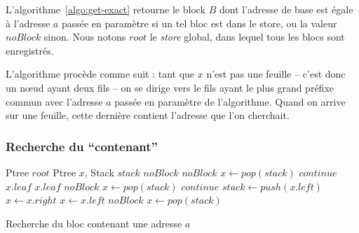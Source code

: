 L'algorithme~\ref{algo:get-exact} retourne le block $B$ dont l'adresse de base
est égale à l'adresse $a$ passée en paramètre si un tel bloc est dans le store,
ou la valeur $noBlock$ sinon.
Nous notons $root$ le {\em store} global, dans lequel tous les blocs sont
enregistrés.

L'algorithme procède comme suit : tant que $x$ n'est pas une feuille -- c'est
donc un n\oe{}ud ayant deux fils -- on se dirige vers le fils ayant le plus
grand préfixe commun avec l'adresse $a$ passée en paramètre de l'algorithme.
Quand on arrive sur une feuille, cette dernière contient l'adresse que l'on
cherchait.


\subsubsection*{Recherche du ``contenant''}


\begin{algorithm}[h!]
\begin{algorithmic}[1]
\Statex Ptree $root$
\Statex
{}
\Statex Ptree $x$, Stack $stack$
  \Return $noBlock$
\Else
          \Return $noBlock$
        \Else
          \State $x \gets \mathit{pop(stack)}$
          \State $\mathit{continue}$
        \EndIf
        \Return $\mathit{x.leaf}$
        \Return $\mathit{x.leaf}$
        \Return $noBlock$
      \Else
        \State $x \gets \mathit{pop(stack)}$
        \State $\mathit{continue}$
      \EndIf
    \EndIf
      \State $\mathit{stack} \gets \mathit{push(x.left)}$
      \State $x \gets \mathit{x.right}$
      \State $x \gets \mathit{x.left}$
      \Return $noBlock$
    \Else
      \State $x \gets \mathit{pop(stack)}$
    \EndIf
  \EndWhile
\EndIf
\EndFunction
\end{algorithmic}
\caption{Recherche du bloc contenant une adresse $a$
  \label{algo:get-cont}}
\end{algorithm}

